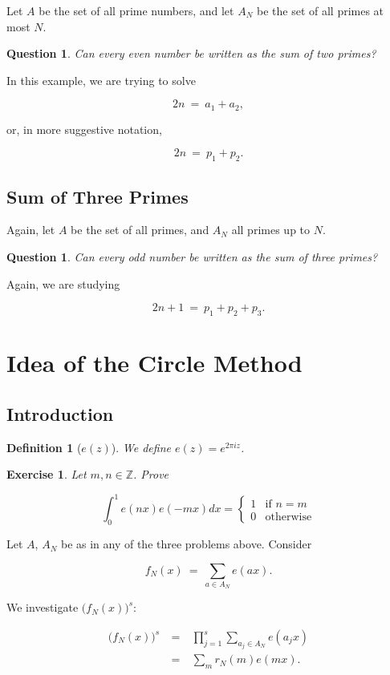 \documentclass[12pt,letterpaper]{report}
\newcommand\be{\begin{equation}}
\newcommand\ee{\end{equation}}
\newcommand\bea{\begin{eqnarray}}
\newcommand\eea{\end{eqnarray}}
\newcommand{\Z}{\ensuremath{\mathbb{Z}}}
\newtheorem{defi}[thm]{Definition}
\newtheorem{exe}[thm]{Exercise}
\newtheorem{que}[thm]{Question}
\newcommand{\twocase}[5]{#1 \begin{cases} #2 & \text{#3}\\ #4
&\text{#5} \end{cases}   }
\begin{document}
Let $A$ be the set of all prime numbers, and let $A_N$ be the set
of all primes at most $N$.

\begin{que} Can every even number be written as the sum of two
primes? \end{que}

In this example, we are trying to solve

\be 2n \ = \ a_1 + a_2, \ee

or, in more suggestive notation,

\be 2n \ = \ p_1 + p_2. \ee


\subsection{Sum of Three Primes}

Again, let $A$ be the set of all primes, and $A_N$ all primes up
to $N$.

\begin{que} Can every odd number be written as the sum of three
primes? \end{que}

Again, we are studying

\be 2n+1 \ = \ p_1 + p_2 + p_3. \ee



\section{Idea of the Circle Method}

\subsection{Introduction}

\begin{defi}[$e(z)$] We define $e(z) = e^{2\pi i z}$.
\end{defi}

\begin{exe} Let $m, n \in \Z$. Prove

\be \twocase{\int_0^1 e(nx) e(-mx)dx =}{1}{if $n =
m$}{0}{otherwise} \ee
\end{exe}

Let $A$, $A_N$ be as in any of the three problems above. Consider

\be f_N(x) \ = \ \sum_{a \in A_N} e(ax). \ee

We investigate $\Big(f_N(x)\Big)^s$:

\bea \Big(f_N(x)\Big)^s & \ = \ & \prod_{j=1}^s \sum_{a_j \in A_N}
e(a_jx) \nonumber\\ & \ = \ & \sum_m r_N(m) e(mx). \eea
\end{document}

